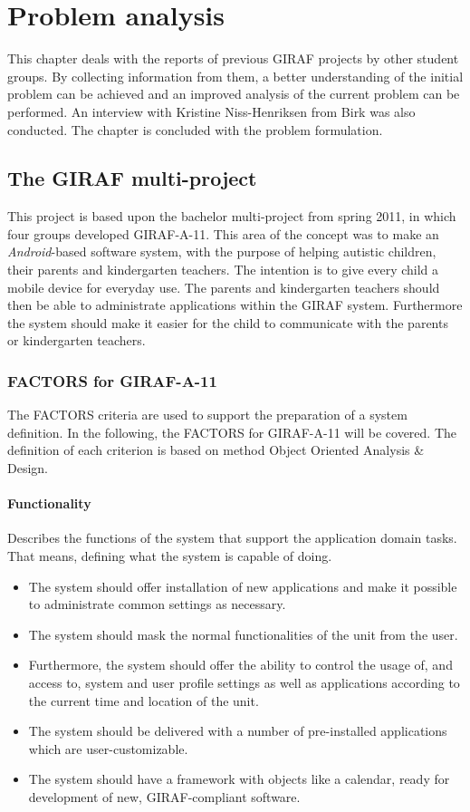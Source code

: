 \chapter{Problem analysis}
This chapter deals with the reports of previous GIRAF projects by other student groups. By collecting information from them, a better understanding of the initial problem can be achieved and an improved analysis of the current problem can be performed. An interview with Kristine Niss-Henriksen from Birk was also conducted. The chapter is concluded with the problem formulation.

\section{The GIRAF multi-project}
This project is based upon the bachelor multi-project from spring 2011, in which four groups developed GIRAF-A-11. This area of the concept was to make an \emph{Android}-based software system, with the purpose of helping autistic children, their parents and kindergarten teachers. The intention is to give every child a mobile device for everyday use. The parents and kindergarten teachers should then be able to administrate applications within the GIRAF system. Furthermore the system should make it easier for the child to communicate with the parents or kindergarten teachers. 

\subsection{FACTORS for GIRAF-A-11}
The FACTORS criteria are used to support the preparation of a system definition. In the following, the FACTORS for GIRAF-A-11 will be covered\cite{giraffactors}. The definition of each criterion is based on method Object Oriented Analysis \& Design\cite{OOAD}.

\subsubsection{Functionality} 
Describes the functions of the system that support the application domain tasks. That means, defining what the system is capable of doing.
\begin{itemize}
	\item The system should offer installation of new applications and make it possible to administrate common settings as necessary.
	\item The system should mask the normal functionalities of the unit from the user.
	\item Furthermore, the system should offer the ability to control the usage of, and access to, system and user profile settings as well as applications according to the current time and location of the unit.
	\item The system should be delivered with a number of pre-installed applications which are user-customizable.
	\item The system should have a framework with objects like a calendar, ready for development of new, GIRAF-compliant software.
\end{itemize}

